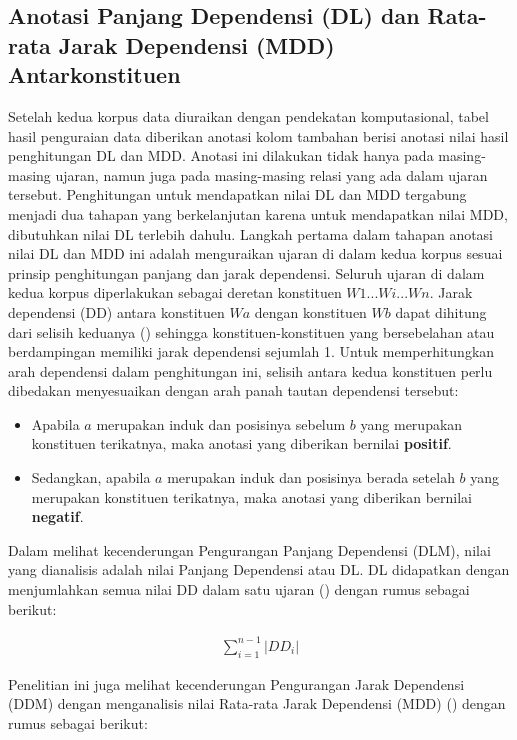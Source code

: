 \subsection{Anotasi Panjang Dependensi (DL) dan Rata-rata Jarak Dependensi (MDD) Antarkonstituen}
Setelah kedua korpus data diuraikan dengan pendekatan komputasional, tabel hasil penguraian data diberikan anotasi kolom tambahan berisi anotasi nilai hasil penghitungan DL dan MDD. Anotasi ini dilakukan tidak hanya pada masing-masing ujaran, namun juga pada masing-masing relasi yang ada dalam ujaran tersebut. Penghitungan untuk mendapatkan nilai DL dan MDD tergabung menjadi dua tahapan yang berkelanjutan karena untuk mendapatkan nilai MDD, dibutuhkan nilai DL terlebih dahulu. Langkah pertama dalam tahapan anotasi nilai DL dan MDD ini adalah menguraikan ujaran di dalam kedua korpus sesuai prinsip penghitungan panjang dan jarak dependensi. Seluruh ujaran di dalam kedua korpus diperlakukan sebagai deretan konstituen $W1...Wi...Wn$. Jarak dependensi (DD) antara konstituen $Wa$ dengan konstituen $Wb$ dapat dihitung dari selisih keduanya (\citealp{liu2008dependency, liu2017dependency, futrell2015large}) sehingga konstituen-konstituen yang bersebelahan atau berdampingan memiliki jarak dependensi sejumlah 1. Untuk memperhitungkan arah dependensi dalam penghitungan ini, selisih antara kedua konstituen perlu dibedakan menyesuaikan dengan arah panah tautan dependensi tersebut:
\begin{itemize}
\item Apabila $a$ merupakan induk dan posisinya sebelum $b$ yang merupakan konstituen terikatnya, maka anotasi yang diberikan bernilai \textbf{positif}.
\item Sedangkan, apabila $a$ merupakan induk dan posisinya berada setelah $b$ yang merupakan konstituen terikatnya, maka anotasi yang diberikan bernilai \textbf{negatif}. 
\end{itemize}
Dalam melihat kecenderungan Pengurangan Panjang Dependensi (DLM), nilai yang dianalisis adalah nilai Panjang Dependensi atau DL. DL didapatkan dengan menjumlahkan semua nilai DD dalam satu ujaran (\citealp{gildea2010grammars, futrell2015large}) dengan rumus sebagai berikut: 

\noindent \begin{align}\label{eq:bola}
	\displaystyle\sum_{i=1}^{n-1} |DD_i|
\end{align}

Penelitian ini juga melihat kecenderungan Pengurangan Jarak Dependensi (DDM) dengan menganalisis nilai Rata-rata Jarak Dependensi (MDD) (\citealp{liu2008dependency, liu2017dependency}) dengan rumus sebagai berikut:

